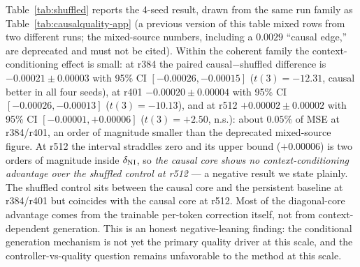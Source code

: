 Table~\ref{tab:shuffled} reports the 4-seed result, drawn from the same run
family as Table~\ref{tab:causalquality-app} (a previous version of this table
mixed rows from two different runs; the mixed-source numbers, including a
$0.0029$ ``causal edge,'' are deprecated and must not be cited). Within the
coherent family the context-conditioning effect is small: at r384 the paired
causal$-$shuffled difference is $-0.00021\pm0.00003$ with 95\% CI
$[-0.00026,-0.00015]$ ($t(3){=}-12.31$, causal better in all four seeds), at
r401 $-0.00020\pm0.00004$ with 95\% CI $[-0.00026,-0.00013]$
($t(3){=}-10.13$), and at r512 $+0.00002\pm0.00002$ with 95\% CI
$[-0.00001,+0.00006]$ ($t(3){=}{+}2.50$, n.s.): about $0.05\%$ of MSE
at r384/r401, an order of magnitude smaller than the deprecated mixed-source
figure. At r512 the interval straddles zero and its upper bound
($+0.00006$) is two orders of magnitude inside $\delta_{\rm NI}$, so
\emph{the causal core shows no context-conditioning advantage over the
shuffled control at r512} --- a negative result we state plainly. The
shuffled control sits between the
causal core and the persistent baseline at r384/r401 but coincides with the
causal core at r512. Most of the diagonal-core advantage comes from the
trainable per-token correction itself, not from context-dependent generation.
This is an honest negative-leaning finding: the conditional generation
mechanism is not yet the primary quality driver at this scale, and the
controller-vs-quality question remains unfavorable to the method at this
scale.



